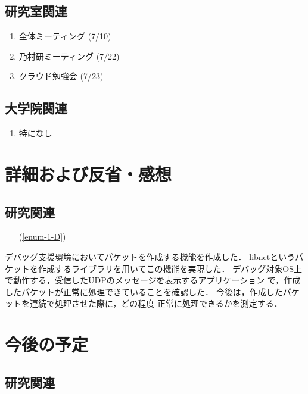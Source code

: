 \documentclass[fleqn, 14pt]{extarticle}
\begin{document}
\subsection{研究室関連}
\label{sec-2-2}
\begin{enumerate}

\item 全体ミーティング
\hfill
\label{enum-lab1}
(7/10)

\item 乃村研ミーティング
\hfill
\label{enum-lab2}
(7/22)

\item クラウド勉強会
\hfill
\label{enum-lab2}
(7/23)

\end{enumerate}

\subsection{大学院関連}
\label{sec2-3}
\begin{enumerate}

    \item 特になし
    \hfill
    \label{enum-univ2}

\end{enumerate}

\section{詳細および反省・感想}
\label{sec-3}
\subsection{研究関連}
\label{sec-3-2}
\begin{itemize}
\item[(\ref{enum-1-D})]
\end{itemize}
デバッグ支援環境においてパケットを作成する機能を作成した．
libnetというパケットを作成するライブラリを用いてこの機能を実現した．
デバッグ対象OS上で動作する，受信したUDPのメッセージを表示するアプリケーション
で，作成したパケットが正常に処理できていることを確認した．
今後は，作成したパケットを連続で処理させた際に，どの程度
正常に処理できるかを測定する．

\section{今後の予定}
\label{sec-4}
\subsection{研究関連}
\label{sec-4-1}
\end{document}
